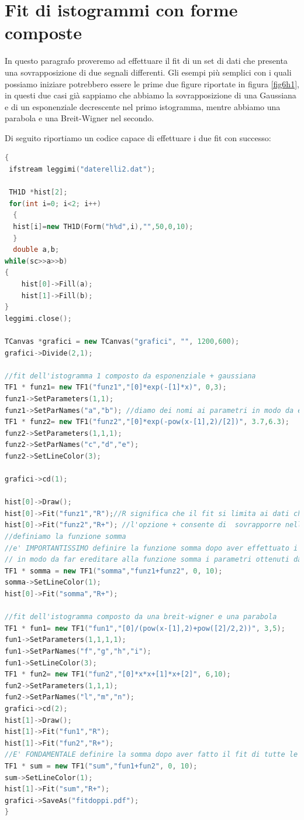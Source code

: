\documentclass[11pt,fleqn]{book} %
\begin{document}
\section{Fit di istogrammi con forme composte}
In questo paragrafo proveremo ad effettuare il fit di un set di dati che presenta una sovrapposizione di due segnali differenti. Gli esempi più semplici con i quali possiamo iniziare potrebbero essere le prime due figure riportate in figura \ref{fig6h1}, in questi due casi già sappiamo che abbiamo la sovrapposizione di una Gaussiana e di un esponenziale decrescente nel primo istogramma, mentre abbiamo una parabola e una Breit-Wigner nel secondo.

Di seguito riportiamo un codice capace di effettuare i due fit con successo:

\begin{lstlisting}[language=c++]
{
 ifstream leggimi("daterelli2.dat");

 TH1D *hist[2];
 for(int i=0; i<2; i++)
  {
  hist[i]=new TH1D(Form("h%d",i),"",50,0,10);
  }
  double a,b;
while(sc>>a>>b)
{
	hist[0]->Fill(a);
	hist[1]->Fill(b);
}
leggimi.close();

TCanvas *grafici = new TCanvas("grafici", "", 1200,600);
grafici->Divide(2,1);

//fit dell'istogramma 1 composto da esponenziale + gaussiana
TF1 * funz1= new TF1("funz1","[0]*exp(-[1]*x)", 0,3);
funz1->SetParameters(1,1);
funz1->SetParNames("a","b"); //diamo dei nomi ai parametri in modo da evitare errori di identificazione dei parametri nella definizione della funzione somma
TF1 * funz2= new TF1("funz2","[0]*exp(-pow(x-[1],2)/[2])", 3.7,6.3);
funz2->SetParameters(1,1,1);
funz2->SetParNames("c","d","e");
funz2->SetLineColor(3);

grafici->cd(1);

hist[0]->Draw();
hist[0]->Fit("funz1","R");//R significa che il fit si limita ai dati che vivono nell'intervallo di definizione della funzione
hist[0]->Fit("funz2","R+"); //l'opzione + consente di  sovrapporre nella figura il secondo fit
//definiamo la funzione somma
//e' IMPORTANTISSIMO definire la funzione somma dopo aver effettuato i primi due fit
// in modo da far ereditare alla funzione somma i parametri ottenuti dai primi due fit parziali
TF1 * somma = new TF1("somma","funz1+funz2", 0, 10);
somma->SetLineColor(1);
hist[0]->Fit("somma","R+");

//fit dell'istogramma composto da una breit-wigner e una parabola
TF1 * fun1= new TF1("fun1","[0]/(pow(x-[1],2)+pow([2]/2,2))", 3,5);      //((x-[2])*(x-[3])+[1]/4)[0]) parametrizzazione alternativa per la Breit-Wigner
fun1->SetParameters(1,1,1,1);
fun1->SetParNames("f","g","h","i");
fun1->SetLineColor(3);
TF1 * fun2= new TF1("fun2","[0]*x*x+[1]*x+[2]", 6,10);
fun2->SetParameters(1,1,1);
fun2->SetParNames("l","m","n");
grafici->cd(2);
hist[1]->Draw();
hist[1]->Fit("fun1","R");
hist[1]->Fit("fun2","R+");
//E' FONDAMENTALE definire la somma dopo aver fatto il fit di tutte le funzioni componenti di sum
TF1 * sum = new TF1("sum","fun1+fun2", 0, 10);
sum->SetLineColor(1);
hist[1]->Fit("sum","R+");
grafici->SaveAs("fitdoppi.pdf");
}
\end{lstlisting}
\end{document}
